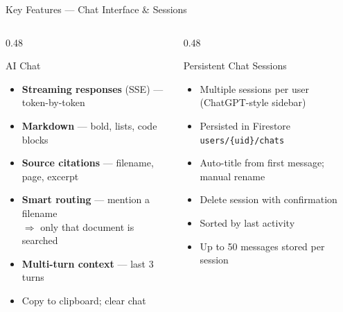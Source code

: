 \documentclass[aspectratio=169]{beamer}
\begin{document}
\begin{frame}[t,shrink=3]{Key Features — Chat Interface \& Sessions}
  \begin{columns}[t]
    \begin{column}{0.48\textwidth}
      \begin{block}{AI Chat}
        \begin{itemize}\setlength\itemsep{0.2em}
          \item \textbf{Streaming responses} (SSE) — token-by-token
          \item \textbf{Markdown} — bold, lists, code blocks
          \item \textbf{Source citations} — filename, page, excerpt
          \item \textbf{Smart routing} — mention a filename\\
                $\Rightarrow$ only that document is searched
          \item \textbf{Multi-turn context} — last 3 turns
          \item Copy to clipboard; clear chat
        \end{itemize}
      \end{block}
    \end{column}
    \begin{column}{0.48\textwidth}
      \begin{block}{Persistent Chat Sessions}
        \begin{itemize}\setlength\itemsep{0.2em}
          \item Multiple sessions per user (ChatGPT-style sidebar)
          \item Persisted in Firestore\\
                {\footnotesize\texttt{users/\{uid\}/chats}}
          \item Auto-title from first message; manual rename
          \item Delete session with confirmation
          \item Sorted by last activity
          \item Up to 50 messages stored per session
        \end{itemize}
      \end{block}
    \end{column}
  \end{columns}
\end{frame}

\end{document}
